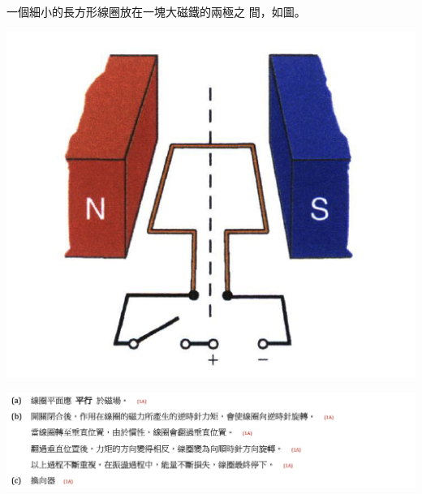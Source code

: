 {
    一個細小的長方形線圈放在一塊大磁鐵的兩極之 間，如圖。
    \par{\par\centering\includegraphics[width=.35\textwidth]{./img/ch4_magnetostatics_lq_2024-06-23-21-14-25.png}\par}
}{\par{\par\centering\includegraphics[width=\textwidth]{./img/ch4_magnetostatics_lq_2024-06-23-21-18-46.png}\par}}